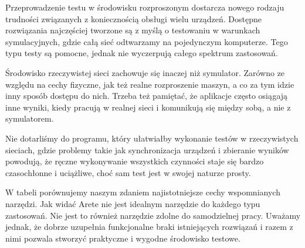 \documentclass[00-praca-magisterska.tex]{subfiles}
\begin{document}
Przeprowadzenie testu w środowisku rozproszonym dostarcza nowego rodzaju
trudności związanych z koniecznością obsługi wielu urządzeń. Dostępne
rozwiązania najczęściej tworzone są z myślą o testowaniu w warunkach
symulacyjnych, gdzie całą sieć odtwarzamy na pojedynczym komputerze. Tego typu
testy są pomocne, jednak nie wyczerpują całego spektrum zastosowań.

Środowisko rzeczywistej sieci zachowuje się inaczej niż symulator. Zarówno ze
względu na cechy fizyczne, jak też realne rozproszenie maszyn, a co za tym
idzie inny sposób dostępu do nich. Trzeba też pamiętać, że aplikacje często
osiągają inne wyniki, kiedy pracują w realnej sieci i komunikują się między
sobą, a nie z symulatorem.

Nie dotarliśmy do programu, który ułatwiałby wykonanie testów w
rzeczywistych sieciach, gdzie problemy takie jak synchronizacja urządzeń i
zbieranie wyników powodują, że ręczne wykonywanie wszystkich czynności staje
się bardzo czasochłonne i uciążliwe, choć sam test jest w swojej naturze prosty.

W tabeli  porównujemy naszym zdaniem najistotniejsze cechy
wspomnianych narzędzi. Jak widać Arete nie jest idealnym narzędzie do każdego
typu zastosowań. Nie jest to również narzędzie zdolne do samodzielnej pracy.
Uważamy jednak, że dobrze uzupełnia funkcjonalne braki istniejących rozwiązań i
razem z nimi pozwala stworzyć praktyczne i wygodne środowisko testowe.
\end{document}
